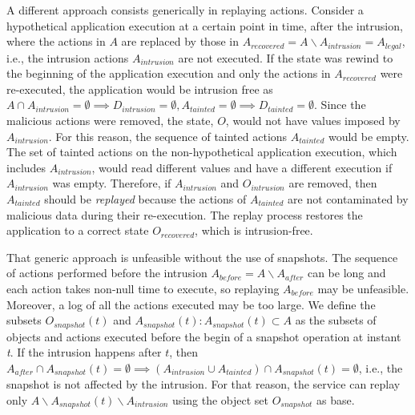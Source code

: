 A different approach consists generically in replaying actions.  Consider a hypothetical application execution at a certain point in time, after the intrusion, where the actions in $A$ are replaced by those in $A_{recovered} = A \backslash A_{intrusion} = A_{legal}$, i.e., the intrusion actions $A_{intrusion}$ are not executed. 
If the state was rewind to the beginning of the application execution and only the actions in $A_{recovered}$ were re-executed, the application would be intrusion free as 
$A \cap A_{intrusion} = \emptyset \implies D_{intrusion} = \emptyset, A_{tainted} = \emptyset \implies D_{tainted} = \emptyset$. 
Since the malicious actions were removed, the state, $O$, would not have values imposed by $A_{intrusion}$. 
For this reason, the sequence of tainted actions $A_{tainted}$ would be empty. 
The set of tainted actions on the non-hypothetical application execution, which includes $A_{intrusion}$, would read different values and have a different execution if $A_{intrusion}$ was empty. 
Therefore, if $A_{intrusion}$ and $O_{intrusion}$ are removed, then $A_{tainted}$ should be \emph{replayed} because the actions of $A_{tainted}$ are not contaminated by malicious data during their re-execution. The replay process restores the application to a correct state $O_{recovered}$, which is intrusion-free.

That generic approach is unfeasible without the use of snapshots.
The sequence of actions performed before the intrusion $A_{before} = A \backslash A_{after}$ can be long and each action takes non-null time to execute, so replaying $A_{before}$ may be unfeasible. Moreover, a log of all the actions executed may be too large.
We define the subsets $O_{snapshot}(t)$ and $A_{snapshot}(t) : A_{snapshot}(t) \subset A$ as the subsets of objects and actions executed before the begin of a snapshot operation at instant \textit{t}. 
If the intrusion happens after $t$, then $A_{after} \cap A_{snapshot}(t) = \emptyset \implies (A_{intrusion} \cup A_{tainted}) \cap A_{snapshot}(t) = \emptyset$, i.e., the snapshot is not affected by the intrusion. For that reason, the service can replay only $A \backslash A_{snapshot}(t) \backslash A_{intrusion}$ using the object set $O_{snapshot}$ as base. 

